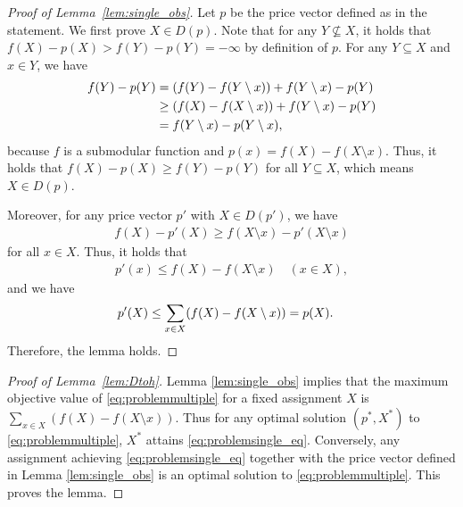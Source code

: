 \documentclass[letterpaper]{article}
\theoremstyle{definition}
\begin{document}
\begin{proof}[Proof of Lemma~\ref{lem:single_obs}]
Let $p$ be the price vector defined as in the statement. 
We first prove $X \in D(p)$.
Note that for any $Y \not\subseteq X$, it holds that $f(X) - p(X) > f(Y) - p(Y) = -\infty$ by definition of $p$. 
For any \(Y\subseteq X\) and \(x \in Y\), we have
\begin{align}
  f(Y) - p(Y)
  &= (f(Y) - f(Y\setminus x)) + f(Y\setminus x) - p(Y)\notag\\
  &\ge (f(X) - f(X\setminus x)) + f(Y\setminus x) - p(Y)\notag\\
  &= f(Y\setminus x) - p(Y\setminus x),
\end{align}
because $f$ is a submodular function and $p(x)=f(X) - f(X\setminus x)$.
Thus, it holds that \(f(X)-p(X)\ge f(Y)-p(Y)\) for all \(Y \subseteq X\), which means $X \in D(p)$.

Moreover, for any price vector $p'$ with $X \in D(p')$, we have 
\begin{align}
  f(X) - p'(X) \ge f(X \setminus x) - p'(X \setminus x)
\end{align}
for all $x \in X$. 
Thus, it holds that
\begin{align}
  p'(x) \le f(X) - f(X \setminus x) \quad (x \in X), 
\end{align}
and we have
\begin{align}
  p'(X)
  &\le \sum_{x \in X} (f(X) - f(X \setminus x)) = p(X)\notag.
\end{align}
Therefore, the lemma holds.
\end{proof}


\begin{proof}[Proof of Lemma~\ref{lem:Dtoh}]
Lemma \ref{lem:single_obs} implies that the maximum objective value of \eqref{eq:problemmultiple} for a fixed assignment $X$ is $\sum_{x \in X} (f(X) - f(X \setminus x))$. 
Thus for any optimal solution $(p^*, X^*)$ to \eqref{eq:problemmultiple}, $X^*$ attains \eqref{eq:problemsingle_eq}. 
Conversely, any assignment achieving \eqref{eq:problemsingle_eq} together with the price vector defined in Lemma \ref{lem:single_obs} is an optimal solution to \eqref{eq:problemmultiple}. 
This proves the lemma.
\end{proof}
\end{document}
